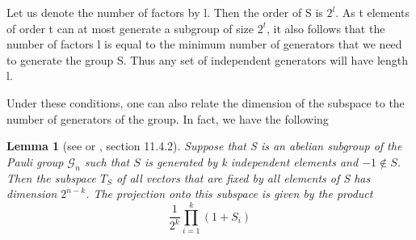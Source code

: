 \documentclass[a4paper, draft]{article}
\theoremstyle{own}
\newtheorem{lem}[thm]{Lemma}
\theoremstyle{remark}
\begin{document}
Let us denote the number of factors by l. Then the order of S is $2^l$. As t elements of order t can at most generate a subgroup of size $2^t$, it also follows that the number of factors l is equal to the minimum number of generators that we need to generate the group S. Thus any set of independent generators will have length l. 

Under these conditions, one can also relate the dimension of the subspace to the number of generators of the group. In fact, we have the following

\begin{lem}[see \cite{G2} or \cite{RieffelPolak}, section 11.4.2]\label{lem:stabilizerdimension}
Suppose that S is an abelian subgroup of the Pauli group $\mathcal{G}_n$ such that $S$ is generated by k independent elements and $-1 \notin S$. Then the subspace $T_S$ of all vectors that are fixed by all elements of S has dimension $2^{n-k}$.  The projection onto this subspace is given by the product
$$
\frac{1}{2^k} \prod_{i=1}^k (1 + S_i)
$$
\end{lem}
\end{document}
